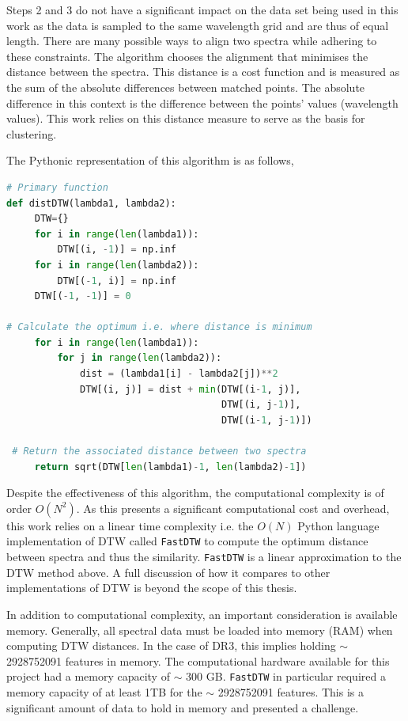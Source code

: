 Steps 2 and 3 do not have a significant impact on the data set being used in this work as the data is sampled to the same wavelength grid and are thus of equal length. 
There are many possible ways to align two spectra while adhering to these constraints. The algorithm chooses the alignment that minimises the distance between the spectra. This distance is a cost function and is measured as the sum of the absolute differences between matched points. The absolute difference in this context is the difference between the points' values (wavelength values). This work relies on this distance measure to serve as the basis for clustering.


The Pythonic representation of this algorithm is as follows,

\begin{lstlisting}[language=Python]
# Primary function
def distDTW(lambda1, lambda2):
     DTW={}
     for i in range(len(lambda1)):
         DTW[(i, -1)] = np.inf
     for i in range(len(lambda2)):
         DTW[(-1, i)] = np.inf
     DTW[(-1, -1)] = 0
 
# Calculate the optimum i.e. where distance is minimum
     for i in range(len(lambda1)):
         for j in range(len(lambda2)):
             dist = (lambda1[i] - lambda2[j])**2
             DTW[(i, j)] = dist + min(DTW[(i-1, j)],
                                      DTW[(i, j-1)], 
                                      DTW[(i-1, j-1)])
 
 # Return the associated distance between two spectra
     return sqrt(DTW[len(lambda1)-1, len(lambda2)-1])
\end{lstlisting}

Despite the effectiveness of this algorithm, the computational complexity is of order $O(N^2)$. As this presents a significant computational cost and overhead, this work relies on a linear time complexity i.e. the $O(N)$ Python language implementation of DTW called \texttt{FastDTW} to compute the optimum distance between spectra and thus the similarity\cite{salvador2007toward}. \texttt{FastDTW} is a linear approximation to the DTW method above. A full discussion of how it compares to other implementations of DTW is beyond the scope of this thesis. 

In addition to computational complexity, an important consideration is available memory. Generally, all spectral data must be loaded into memory (RAM) when computing DTW distances. In the case of DR3, this implies holding $\sim$ \num[round-precision=2,round-mode=figures, scientific-notation=true]{2928752091} features in memory. The computational hardware available for this project had a memory capacity of $\sim$ 300 GB. \texttt{FastDTW} in particular required a memory capacity of at least 1TB for the $\sim$ \num[round-precision=2,round-mode=figures, scientific-notation=true]{2928752091} features. This is a significant amount of data to hold in memory and presented a challenge.


